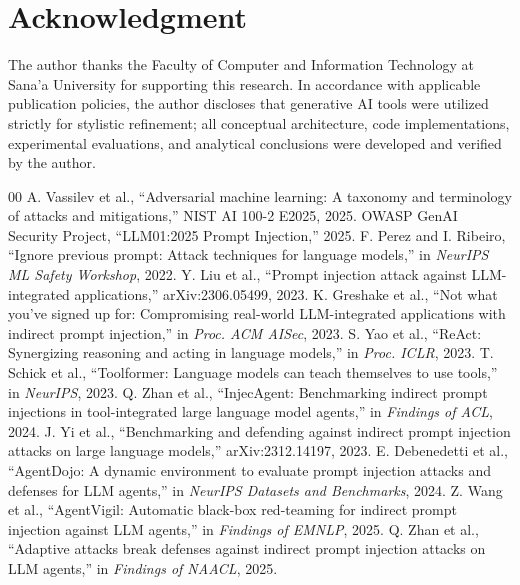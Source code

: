 \documentclass[conference]{IEEEtran}
\begin{document}
\section*{Acknowledgment}
The author thanks the Faculty of Computer and Information Technology at Sana'a University for supporting this research. In accordance with applicable publication policies, the author discloses that generative AI tools were utilized strictly for stylistic refinement; all conceptual architecture, code implementations, experimental evaluations, and analytical conclusions were developed and verified by the author.

\begin{thebibliography}{00}
 A. Vassilev et al., ``Adversarial machine learning: A taxonomy and terminology of attacks and mitigations,'' NIST AI 100-2 E2025, 2025.
 OWASP GenAI Security Project, ``LLM01:2025 Prompt Injection,'' 2025.
 F. Perez and I. Ribeiro, ``Ignore previous prompt: Attack techniques for language models,'' in \textit{NeurIPS ML Safety Workshop}, 2022.
 Y. Liu et al., ``Prompt injection attack against LLM-integrated applications,'' arXiv:2306.05499, 2023.
 K. Greshake et al., ``Not what you've signed up for: Compromising real-world LLM-integrated applications with indirect prompt injection,'' in \textit{Proc. ACM AISec}, 2023.
 S. Yao et al., ``ReAct: Synergizing reasoning and acting in language models,'' in \textit{Proc. ICLR}, 2023.
 T. Schick et al., ``Toolformer: Language models can teach themselves to use tools,'' in \textit{NeurIPS}, 2023.
 Q. Zhan et al., ``InjecAgent: Benchmarking indirect prompt injections in tool-integrated large language model agents,'' in \textit{Findings of ACL}, 2024.
 J. Yi et al., ``Benchmarking and defending against indirect prompt injection attacks on large language models,'' arXiv:2312.14197, 2023.
 E. Debenedetti et al., ``AgentDojo: A dynamic environment to evaluate prompt injection attacks and defenses for LLM agents,'' in \textit{NeurIPS Datasets and Benchmarks}, 2024.
 Z. Wang et al., ``AgentVigil: Automatic black-box red-teaming for indirect prompt injection against LLM agents,'' in \textit{Findings of EMNLP}, 2025.
 Q. Zhan et al., ``Adaptive attacks break defenses against indirect prompt injection attacks on LLM agents,'' in \textit{Findings of NAACL}, 2025.

\end{thebibliography}
\end{document}
